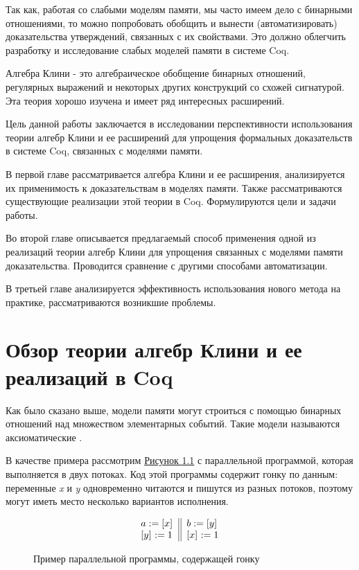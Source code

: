 \documentclass[times
              ,specification
              ,annotation
              ]{itmo-student-thesis}
\begin{document}
  Так как, работая со слабыми моделям памяти, мы часто имеем дело с бинарными отношениями, то можно
  попробовать обобщить и вынести (автоматизировать) доказательства утверждений, связанных с их свойствами.
  Это должно облегчить разработку и исследование слабых моделей памяти в системе Coq.

  Алгебра Клини - это алгебраическое обобщение бинарных отношений, регулярных выражений и некоторых
  других конструкций со схожей сигнатурой.
  Эта теория хорошо изучена и имеет ряд интересных расширений.

  Цель данной работы заключается в исследовании перспективности использования теории алгебр Клини и ее
  расширений для упрощения формальных доказательств в системе Coq, связанных с моделями памяти.


  В первой главе рассматривается алгебра Клини и ее расширения, анализируется их применимость к
  доказательствам в моделях памяти. Также рассматриваются существующие реализации этой теории в Coq.
  Формулируются цели и задачи работы.

  Во второй главе описывается предлагаемый способ применения одной из реализаций теории алгебр Клини
  для упрощения связанных с моделями памяти доказательства. Проводится сравнение с другими способами автоматизации. 

  В третьей главе анализируется эффективность использования нового метода на практике, рассматриваются
  возникшие проблемы.

\chapter{Обзор теории алгебр Клини и ее реализаций в Coq}\label{chapter:1}

  Как было сказано выше, модели памяти могут строиться с помощью бинарных отношений над множеством
  элементарных событий. Такие модели называются аксиоматические \cite{axiomatic_memory_model_for_power_mp}.

  В качестве примера рассмотрим \hyperref[fig:pic1]{Рисунок \ref{fig:pic1}} с параллельной программой,
  которая выполняется в двух потоках. Код этой программы содержит гонку по данным: переменные
  \textit{x} и \textit{y} одновременно читаются и пишутся из разных потоков,
  поэтому могут иметь место несколько вариантов исполнения.

  \begin{figure}[!h]
    \caption{Пример параллельной программы, содержащей гонку}
    \label{fig:pic1}
    \centering
    \begin{equation}
      \inarrII{
        \readInst{}{a}{x}  \\
        \writeInst{}{y}{1} \\
      }{
        \readInst{}{b}{y}  \\
        \writeInst{}{x}{1} \\
      }
    \end{equation}
  \end{figure}
\end{document}
